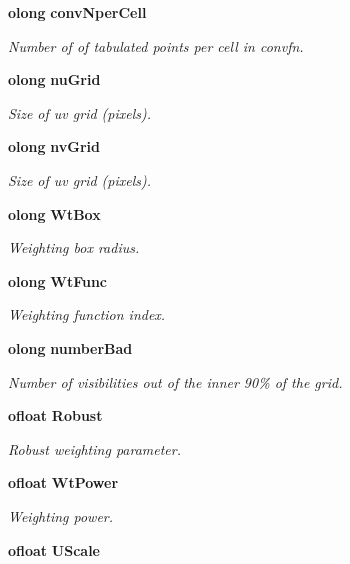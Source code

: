 \begin{CompactItemize}
{\bf olong} {\bf conv\-Nper\-Cell}
\begin{CompactList}\small\item\em Number of of tabulated points per cell in convfn. \item\end{CompactList}\item 
{\bf olong} {\bf nu\-Grid}
\begin{CompactList}\small\item\em Size of uv grid (pixels). \item\end{CompactList}\item 
{\bf olong} {\bf nv\-Grid}
\begin{CompactList}\small\item\em Size of uv grid (pixels). \item\end{CompactList}\item 
{\bf olong} {\bf Wt\-Box}
\begin{CompactList}\small\item\em Weighting box radius. \item\end{CompactList}\item 
{\bf olong} {\bf Wt\-Func}
\begin{CompactList}\small\item\em Weighting function index. \item\end{CompactList}\item 
{\bf olong} {\bf number\-Bad}
\begin{CompactList}\small\item\em Number of visibilities out of the inner 90\% of the grid. \item\end{CompactList}\item 
{\bf ofloat} {\bf Robust}
\begin{CompactList}\small\item\em Robust weighting parameter. \item\end{CompactList}\item 
{\bf ofloat} {\bf Wt\-Power}
\begin{CompactList}\small\item\em Weighting power. \item\end{CompactList}\item 
{\bf ofloat} {\bf UScale}

\end{CompactItemize}
